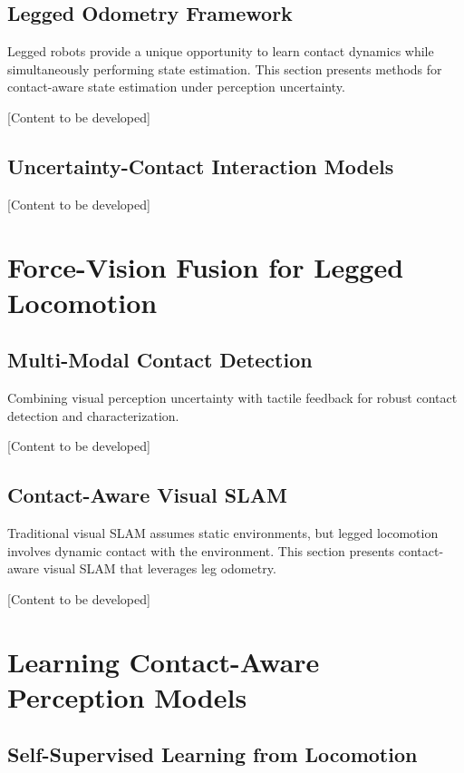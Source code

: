 \subsection{Legged Odometry Framework}

Legged robots provide a unique opportunity to learn contact dynamics while simultaneously performing state estimation. This section presents methods for contact-aware state estimation under perception uncertainty.

[Content to be developed]

\subsection{Uncertainty-Contact Interaction Models}

[Content to be developed]

\section{Force-Vision Fusion for Legged Locomotion}

\subsection{Multi-Modal Contact Detection}

Combining visual perception uncertainty with tactile feedback for robust contact detection and characterization.

[Content to be developed]

\subsection{Contact-Aware Visual SLAM}

Traditional visual SLAM assumes static environments, but legged locomotion involves dynamic contact with the environment. This section presents contact-aware visual SLAM that leverages leg odometry.

[Content to be developed]

\section{Learning Contact-Aware Perception Models}

\subsection{Self-Supervised Learning from Locomotion}

